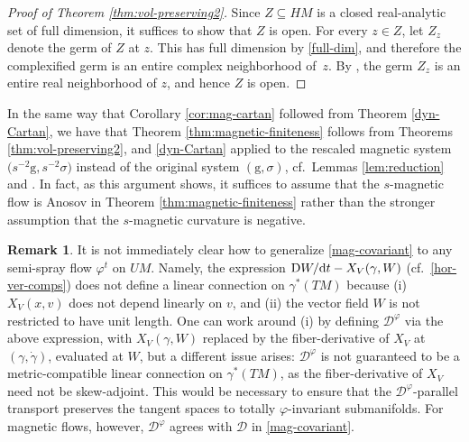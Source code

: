 \documentclass[10pt,a4paper]{amsart}
\newcommand{\g}{\mathrm{g}}
\numberwithin{equation}{section}
\theoremstyle{definition}
\newtheorem{rem}[Theorem]{Remark}
\begin{document}
\begin{proof}[Proof of Theorem \ref{thm:vol-preserving2}]
Since $Z \subseteq HM$ is a closed real-analytic set of full dimension, it suffices to show that $Z$ is open. For every $z \in Z$, let $Z_z$ denote the germ of $Z$ at $z$. This has full dimension by \eqref{full-dim}, and therefore the complexified germ is an entire complex neighborhood of~$z$. By \cite[Chapter V, Proposition 1]{narasimhan2006introduction}, the germ $Z_z$ is an entire real neighborhood of $z$, and hence $Z$ is open.
\end{proof}

In the same way that Corollary \ref{cor:mag-cartan} followed from Theorem \ref{dyn-Cartan}, we have that Theorem \ref{thm:magnetic-finiteness} follows from Theorems \ref{thm:vol-preserving2}, and \ref{dyn-Cartan} applied to the rescaled magnetic system $\bigl(s^{-2}\g,s^{-2}\sigma\bigr)$ instead of the original system $(\g,\sigma)$, cf.\ Lemmas \ref{lem:reduction} and \cite{Paternains-94-convex}. In fact, as this argument shows, it suffices to assume that the \mbox{$s$-mag\-ne\-tic} flow is Anosov in Theorem \ref{thm:magnetic-finiteness} rather than the stronger assumption that the $s$-magnetic curvature is negative.

\begin{rem}\label{bugs}
 It is not immediately clear how to generalize \eqref{mag-covariant} to any semi-spray flow $\varphi^t$ on $UM$. Namely, the expression ${\rm D}W/{\rm d}t - X_V(\gamma, W)$ (cf.\ \eqref{hor-ver-comps}) does not define a linear connection on $\gamma^*(TM)$ because (i) $X_V(x,v)$ does not depend linearly on $v$, and (ii) the vector field $W$ is not restricted to have unit length. One can work around (i) by defining $\mathcal{D}^\varphi$ via the above expression, with $X_V(\gamma,W)$ replaced by the fiber-derivative of $X_V$ at $(\gamma,\dot{\gamma})$, evaluated at $W$, but a different issue arises: $\mathcal{D}^\varphi$ is not guaranteed to be a metric-compatible linear connection on $\gamma^*(TM)$, as the fiber-derivative of $X_V$ need not be skew-adjoint. This would be necessary to ensure that the $\mathcal{D}^\varphi$-parallel transport preserves the tangent spaces to totally $\varphi$-invariant submanifolds. For magnetic flows, however, $\mathcal{D}^\varphi$ agrees with $\mathcal{D}$ in \eqref{mag-covariant}.
\end{rem}
\end{document}
